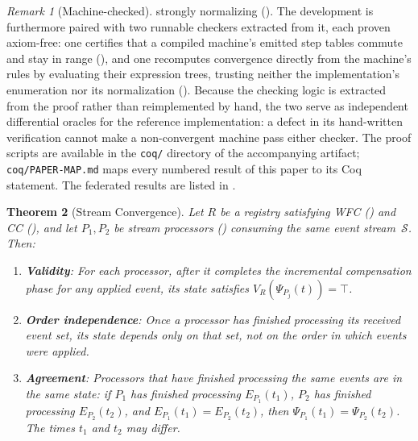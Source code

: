 \documentclass[11pt,a4paper]{article}
\theoremstyle{plain}
\newtheorem{theorem}{Theorem}[section]
\theoremstyle{definition}
\theoremstyle{remark}
\newtheorem{remark}[theorem]{Remark}
\renewcommand{\_}{\textunderscore\allowbreak}
\begin{document}
\begin{remark}[Machine-checked]
strongly normalizing ().  The development is
furthermore paired with two runnable checkers extracted from it, each proven
axiom-free: one certifies that a compiled machine's emitted step tables
commute and stay in range (), and one recomputes
convergence directly from the machine's rules by evaluating their expression
trees, trusting neither the implementation's enumeration nor its
normalization ().  Because the checking logic is
extracted from the proof rather than reimplemented by hand, the two serve as
independent differential oracles for the reference implementation: a defect
in its hand-written verification cannot make a non-convergent machine pass
either checker.  The proof scripts are available in the \texttt{coq/}
directory of the accompanying artifact; \texttt{coq/PAPER-MAP.md} maps every
numbered result of this paper to its Coq statement.  The federated results
are listed in .
\end{remark}

\begin{theorem}[Stream Convergence]
\label{thm:convergence}
Let $R$ be a registry satisfying WFC () and CC
(), and let $P_1, P_2$ be stream processors
() consuming the same event stream~$\mathcal{S}$.
Then:
\begin{enumerate}[leftmargin=*,nosep,label=(\alph*)]
\item \textbf{Validity}: For each processor, after it completes the
  incremental compensation phase for any applied event, its state satisfies
  $V_R(\Psi_{P_j}(t)) = \top$.
\item \textbf{Order independence}: Once a processor has finished processing
  its received event set, its state depends only on that set, not on the
  order in which events were applied.
\item \textbf{Agreement}: Processors that have finished processing the same
  events are in the same state: if $P_1$ has finished processing
  $E_{P_1}(t_1)$, $P_2$ has finished processing $E_{P_2}(t_2)$, and
  $E_{P_1}(t_1) = E_{P_2}(t_2)$, then $\Psi_{P_1}(t_1) = \Psi_{P_2}(t_2)$.
  The times $t_1$ and $t_2$ may differ.
\end{enumerate}
\end{theorem}
\end{document}
